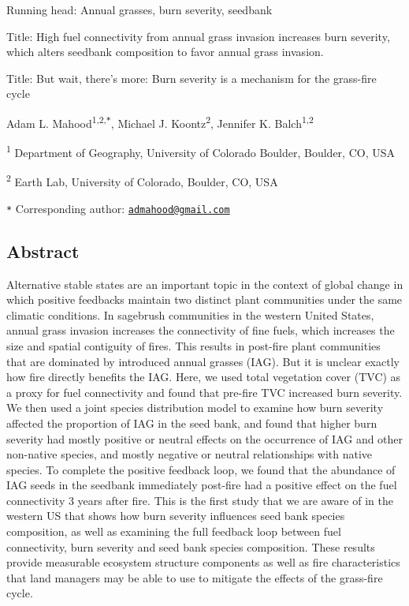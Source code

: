 \documentclass[
  12pt,
]{article}
\author{}
\date{\vspace{-2.5em}}
\begin{document}

\pagebreak


Running head: Annual grasses, burn severity, seedbank

Title: High fuel connectivity from annual grass invasion increases burn
severity, which alters seedbank composition to favor annual grass
invasion.

Title: But wait, there's more: Burn severity is a mechanism for the
grass-fire cycle

Adam L. Mahood\textsuperscript{1,2,\texttt{*}}, Michael J.
Koontz\textsuperscript{2}, Jennifer K. Balch\textsuperscript{1,2}

\small

\textsuperscript{1} Department of Geography, University of Colorado
Boulder, Boulder, CO, USA

\textsuperscript{2} Earth Lab, University of Colorado, Boulder, CO, USA

\texttt{*} Corresponding author:
\href{mailto:admahood@gmail.com}{\nolinkurl{admahood@gmail.com}}

\normalsize

\newpage

\linenumbers

\hypertarget{abstract}{%
\subsection{Abstract}\label{abstract}}

Alternative stable states are an important topic in the context of
global change in which positive feedbacks maintain two distinct plant
communities under the same climatic conditions. In sagebrush communities
in the western United States, annual grass invasion increases the
connectivity of fine fuels, which increases the size and spatial
contiguity of fires. This results in post-fire plant communities that
are dominated by introduced annual grasses (IAG). But it is unclear
exactly how fire directly benefits the IAG. Here, we used total
vegetation cover (TVC) as a proxy for fuel connectivity and found that
pre-fire TVC increased burn severity. We then used a joint species
distribution model to examine how burn severity affected the proportion
of IAG in the seed bank, and found that higher burn severity had mostly
positive or neutral effects on the occurrence of IAG and other
non-native species, and mostly negative or neutral relationships with
native species. To complete the positive feedback loop, we found that
the abundance of IAG seeds in the seedbank immediately post-fire had a
positive effect on the fuel connectivity 3 years after fire. This is the
first study that we are aware of in the western US that shows how burn
severity influences seed bank species composition, as well as examining
the full feedback loop between fuel connectivity, burn severity and seed
bank species composition. These results provide measurable ecosystem
structure components as well as fire characteristics that land managers
may be able to use to mitigate the effects of the grass-fire cycle.
\end{document}

